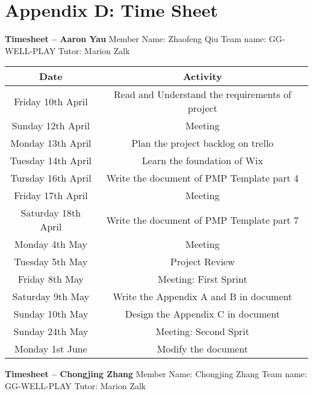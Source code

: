 \chapter*{Appendix D: Time Sheet}

\textbf{Timesheet – Aaron Yau}
Member Name: Zhaofeng Qiu
Team name: GG-WELL-PLAY
Tutor: Marion Zalk

\begin{tabular}{|c|c|}
\hline
Date & Activity\\
\hline
Friday 10th April & Read and Understand the requirements of project\\
\hline
Sunday 12th April & Meeting\\
\hline
Monday 13th April & Plan the project backlog on trello\\
\hline
Tuesday 14th April & Learn the foundation of Wix\\
\hline
Tursday 16th April & Write the document of PMP Template part 4\\
\hline
Friday 17th April & Meeting\\
\hline
Saturday 18th April & Write the document of PMP Template part 7\\
\hline
Monday 4th May & Meeting\\
\hline
Tuesday 5th May & Project Review\\
\hline
Friday 8th May & Meeting: First Sprint\\
\hline
Saturday 9th May & Write the Appendix A and B in document\\
\hline
Sunday 10th May & Design the Appendix C in document\\
\hline
Sunday 24th May & Meeting: Second Sprit\\
\hline
Monday 1st June & Modify the document\\
\hline
\end{tabular}

\textbf{Timesheet – Chongjing Zhang}
Member Name: Chongjing Zhang
Team name: GG-WELL-PLAY
Tutor: Marion Zalk

